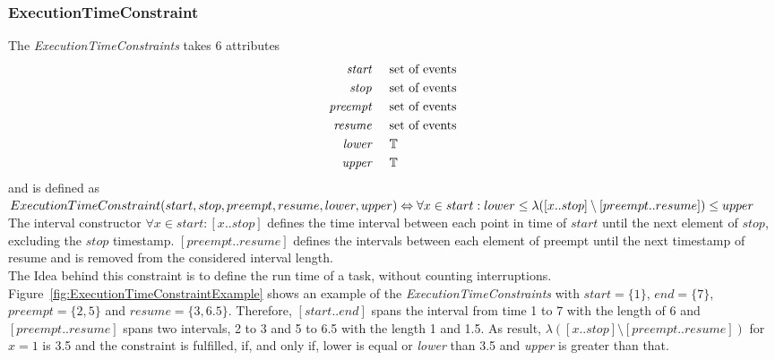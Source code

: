 	\subsubsection{ExecutionTimeConstraint}
		The \emph{ExecutionTimeConstraints} takes 6 attributes
		\begin{align*}
			\emph{start} & \hspace{.5cm}\text{set of events}\\
			\emph{stop} & \hspace{.5cm}\text{set of events}\\
			\emph{preempt} & \hspace{.5cm}\text{set of events}\\
			\emph{resume} & \hspace{.5cm}\text{set of events}\\
			\emph{lower} & \hspace{.5cm}\mathbb{T}\\
			\emph{upper} & \hspace{.5cm}\mathbb{T}\\
		\end{align*}
		and is defined as\\[10pt]
		\begin{math}
			ExecutionTimeConstraint (start, stop, preempt, resume, lower, upper)\\
			\Leftrightarrow\forall x\in start: lower\leq \lambda([x..stop]\setminus[preempt..resume]) \leq upper
		\end{math}\\[10pt]
		The interval constructor $\forall x\in start: [x..stop]$ defines the time interval between each point in time of $start$ until the next element of $stop$, excluding the $stop$ timestamp. $[preempt..resume]$ defines the intervals between each element of preempt until the next timestamp of resume and is removed from the considered interval length.\\
		The Idea behind this constraint is to define the run time of a task, without counting interruptions.\\
		Figure~\ref{fig:ExecutionTimeConstraintExample} shows an example of the \emph{ExecutionTimeConstraints} with $start=\{1\}$, $end=\{7\}$, $preempt=\{2, 5\}$ and $resume = \{3, 6.5\}$. Therefore, $[start..end]$ spans the interval from time 1 to 7 with the length of 6 and $[preempt..resume]$ spans two intervals, 2 to 3 and 5 to 6.5 with the length 1 and 1.5. As result, $\lambda([x..stop]\setminus[preempt..resume])$ for $x = 1$ is 3.5 and the constraint is fulfilled, if, and only if, lower is equal or \emph{lower} than 3.5 and \emph{upper} is greater than that.\\
